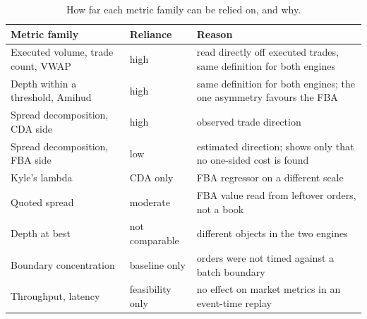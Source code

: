 \begin{table}[htbp]
\centering
\caption[How far each metric can be relied on]{How far each metric family
can be relied on, and why.}
\label{tab:confidence}
\small
\begin{tabularx}{\textwidth}{@{}p{4.2cm} p{2.4cm} L@{}}
\toprule
\textbf{Metric family} & \textbf{Reliance} & \textbf{Reason}\\
\midrule
Executed volume, trade count, VWAP & high & read directly off executed trades, same definition for both engines\\
Depth within a threshold, Amihud & high & same definition for both engines; the one asymmetry favours the FBA\\
Spread decomposition, CDA side & high & observed trade direction\\
Spread decomposition, FBA side & low & estimated direction; shows only that no one-sided cost is found\\
Kyle's lambda & CDA only & FBA regressor on a different scale\\
Quoted spread & moderate & FBA value read from leftover orders, not a book\\
Depth at best & not comparable & different objects in the two engines\\
Boundary concentration & baseline only & orders were not timed against a batch boundary\\
Throughput, latency & feasibility only & no effect on market metrics in an event-time replay\\
\bottomrule
\end{tabularx}
\end{table}
